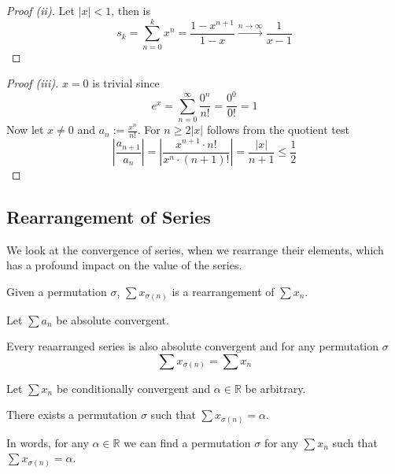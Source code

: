 \begin{proof}[Proof (ii)]
   Let \(|x| < 1 \), then is
   \[s_k = \sum_{n = 0}^k x^n = \frac{1 - x^{n+1}}{1 - x} \xrightarrow{n \to \infty} \frac{1}{x-1}\]
\end{proof}
\begin{proof}[Proof (iii)]
   \(x = 0\) is trivial since
   \[e^x = \sum_{n=0}^\infty \frac{0^n}{n!} = \frac{0^0}{0!} = 1\]
   Now let \(x \neq 0\) and \(a_n := \frac{x^n}{n!}\).
   For \(n \geq 2\lvert x\rvert\) follows from the quotient test
   \[\left\lvert \frac{a_{n+1}}{a_n} \right\rvert = \left\lvert \frac{x^{n+1} \cdot n!}{x^n \cdot (n+1)!}\right\rvert = \frac{\lvert x\rvert}{n+1} \leq \frac{1}{2}\]
\end{proof}

\subsection{Rearrangement of Series}
We look at the convergence of series, when we rearrange their elements, which has a profound impact on the value of the series.
\begin{definition}
   Given a permutation \(\sigma\), \(\sum x_{\sigma(n)}\) is a rearrangement of \(\sum x_n\).
\end{definition}

\begin{theorem}\label{thm:rearrange_series}
   Let \(\sum a_n\) be absolute convergent.

   Every reaarranged series is also absolute convergent and for any permutation \(\sigma\)
   \[\sum x_{\sigma(n)} = \sum x_n\]
\end{theorem}

\begin{proposition}\label{pro:riemann_rearrang}
   Let \(\sum x_n\) be conditionally convergent and \(\alpha \in \mathbb{R}\) be arbitrary.

   There exists a permutation \(\sigma\) such that \(\sum x_{\sigma(n)} = \alpha\).
\end{proposition}
\begin{remark}[Intuition]
   In words, for any \(\alpha \in \mathbb{R}\) we can find a permutation \(\sigma\) for any \(\sum x_n\) such that \(\sum x_{\sigma(n)} = \alpha\).
\end{remark}

